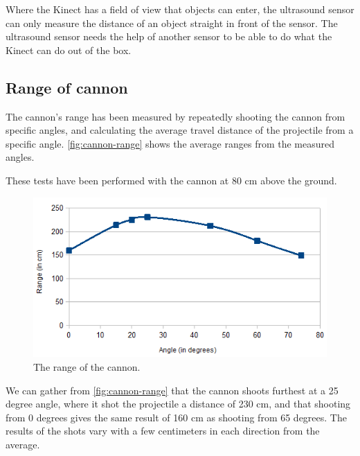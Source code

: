 Where the Kinect has a field of view that objects can enter, the ultrasound sensor can only measure the distance of an object straight in front of the sensor. The ultrasound sensor needs the help of another sensor to be able to do what the Kinect can do out of the box.

\subsection{Range of cannon}
The cannon's range has been measured by repeatedly shooting the cannon from specific angles, and calculating the average travel distance of the projectile from a specific angle. \autoref{fig:cannon-range} shows the average ranges from the measured angles.

These tests have been performed with the cannon at 80 cm above the ground.

\begin{figure}[hbtp]
\includegraphics[width=\textwidth]{img/cannon-range.png}
\caption{The range of the cannon.} 
\label{fig:cannon-range} 
\end{figure}

We can gather from \autoref{fig:cannon-range} that the cannon shoots furthest at a 25 degree angle, where it shot the projectile a distance of 230 cm, and that shooting from 0 degrees gives the same result of 160 cm as shooting from 65 degrees. The results of the shots vary with a few centimeters in each direction from the average.


